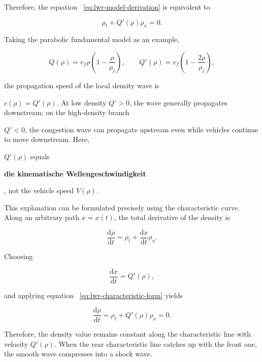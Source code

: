 \documentclass[11pt,a4paper,openany]{book}
\numberwithin{equation}{chapter}
\numberwithin{figure}{chapter}
\numberwithin{table}{chapter}
\begin{document}
Therefore, the equation ~\eqref{eq:lwr-model-derivation} is equivalent to

\begin{equation}
\rho_t+Q'(\rho)\rho_x=0.
\label{eq:lwr-characteristic-form}
\end{equation}

Taking the parabolic fundamental model as an example,

\begin{equation}
Q(\rho)=v_f\rho\left(1-\frac{\rho}{\rho_j}\right),
\qquad
Q'(\rho)=v_f\left(1-\frac{2\rho}{\rho_j}\right),
\label{eq:lwr-example-flux}
\end{equation}

the propagation speed of the local density wave is

$c(\rho)=Q'(\rho)$. At low density $Q'>0$, the wave generally propagates downstream; on the high-density branch

$Q'<0$, the congestion wave can propagate upstream even while vehicles continue to move downstream. Here,

$Q'(\rho)$ equals






\textbf{die kinematische Wellengeschwindigkeit}

, not the vehicle speed $V(\rho)$.




This explanation can be formulated precisely using the characteristic curve. Along an arbitrary path $x=x(t)$, the total derivative of the density is

\begin{equation}
\frac{\mathrm d\rho}{\mathrm dt}
=\rho_t+\frac{\mathrm dx}{\mathrm dt}\rho_x.
\label{eq:lwr-density-total-derivative}
\end{equation}

Choosing

\begin{equation}
\frac{\mathrm dx}{\mathrm dt}=Q'(\rho),
\label{eq:lwr-characteristic-speed-detail}
\end{equation}

and applying equation ~\eqref{eq:lwr-characteristic-form} yields

\begin{equation}
\frac{\mathrm d\rho}{\mathrm dt}
=\rho_t+Q'(\rho)\rho_x=0.
\end{equation}

Therefore, the density value remains constant along the characteristic line with velocity $Q'(\rho)$. When the rear characteristic line catches up with the front one, the smooth wave compresses into a shock wave.
\end{document}

